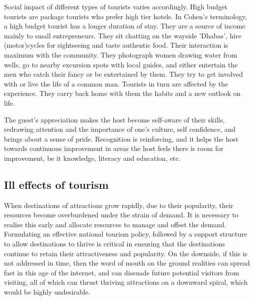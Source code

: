 Social impact of different types of tourists varies accordingly. High budget tourists are package tourists who prefer high tier hotels. In Cohen's terminology, a high budget tourist has a longer duration of stay. They are a source of income mainly to small entrepreneurs. They sit chatting on the wayside 'Dhabas', hire (motor)cycles for sightseeing and taste authentic food. Their interaction is maximum with the community. They photograph women drawing water from wells, go to nearby excursion spots with local guides, and either entertain the men who catch their fancy or be entertained by them. They try to get involved with or live the life of a common man. Tourists in turn are affected by the experience. They carry back home with them the habits and a new outlook on life.

The guest's appreciation makes the host become self-aware of their skills, redrawing attention and the importance of one's culture, self confidence, and brings about a sense of pride. Recognition is reinforcing, and it helps the host towards continuous improvement in areas the host feels there is room for improvement, be it knowledge, literacy and education, etc.


\subsection{Ill effects of tourism} %
\label{sub:iet}

When destinations of attractions grow rapidly, due to their popularity, their resources become overburdened under the strain of demand. It is necessary to realise this early and allocate resources to manage and offset the demand. Formulating an effective national tourism policy, followed by a support structure to allow destinations to thrive is critical in ensuring that the destinations continue to retain their attractiveness and popularity. On the downside, if this is not addressed in time, then the word of mouth on the ground realities can spread fast in this age of the internet, and can dissuade future potential visitors from visiting, all of which can thrust thriving attractions on a downward spiral, which would be highly undesirable.


